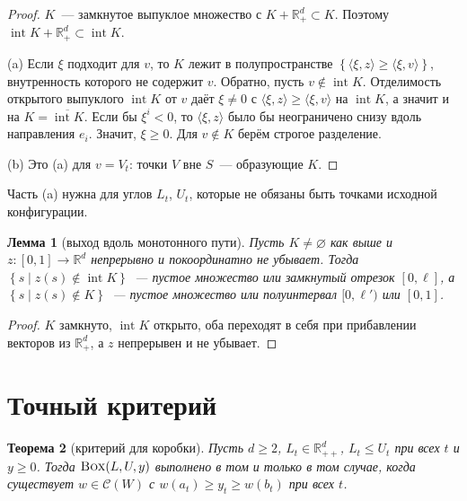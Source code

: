 \documentclass[a4paper,11pt]{article}
\theoremstyle{plain}
\newtheorem{theorem}{Теорема}[section]
\newtheorem{lemma}[theorem]{Лемма}
\theoremstyle{definition}
\theoremstyle{remark}
\newcommand{\R}{\mathbb{R}}
\newcommand{\set}[1]{\left\{ #1 \right\}}
\newcommand{\ip}[2]{\langle #1, #2\rangle}
\newcommand{\Rpp}[1][2]{\R^{#1}_{++}}
\newcommand{\Rp}[1][2]{\R^{#1}_{+}}
\DeclareMathOperator{\interior}{int}
\newcommand{\BOX}{\textup{\textsc{Box}}}
\newcommand{\Cw}{\mathcal C}
\begin{document}
\begin{proof}
    $K$~--- замкнутое выпуклое множество с $K+\Rp[d]\subset K$. Поэтому $\interior K+\Rp[d]\subset\interior K$.

    (a) Если $\xi$ подходит для $v$, то $K$ лежит в полупространстве $\set{\ip{\xi}{z}\ge\ip{\xi}{v}}$, внутренность которого не содержит $v$. Обратно, пусть $v\notin\interior K$. Отделимость открытого выпуклого $\interior K$ от $v$ даёт $\xi\ne0$ с $\ip{\xi}{z}\ge\ip{\xi}{v}$ на $\interior K$, а значит и на $K=\overline{\interior K}$. Если бы $\xi^i<0$, то $\ip{\xi}{z}$ было бы неограничено снизу вдоль направления $e_i$. Значит, $\xi\ge0$. Для $v\notin K$ берём строгое разделение.

    (b) Это (a) для $v=V_t$: точки $V$ вне $S$~--- образующие $K$.
\end{proof}

Часть (a) нужна для углов $L_t$, $U_t$, которые не обязаны быть точками исходной конфигурации.

\begin{lemma}[выход вдоль монотонного пути]\label{lem:exit}
    Пусть $K\ne\varnothing$ как выше и $z\colon[0,1]\to\R^d$ непрерывно и покоординатно не убывает. Тогда $\set{s\mid z(s)\notin\interior K}$~--- пустое множество или замкнутый отрезок $[0,\ell]$, а $\set{s\mid z(s)\notin K}$~--- пустое множество или полуинтервал $[0,\ell')$ или $[0,1]$.
\end{lemma}

\begin{proof}
    $K$ замкнуто, $\interior K$ открыто, оба переходят в себя при прибавлении векторов из $\Rp[d]$, а $z$ непрерывен и не убывает.
\end{proof}

\section{Точный критерий}\label{sec:thm1}

\begin{theorem}[критерий для коробки]\label{thm:box}
    Пусть $d\ge2$, $L_t\in\Rpp[d]$, $L_t\le U_t$ при всех $t$ и $y\ge0$. Тогда $\BOX(L,U,y)$ выполнено в том и только в том случае, когда существует $w\in\Cw(W)$ с $w(a_t)\ge y_t\ge w(b_t)$ при всех $t$.
\end{theorem}
\end{document}
